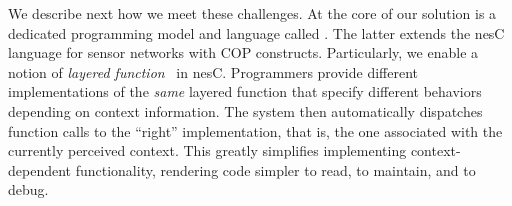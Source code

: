 We describe next how we meet these challenges. At the core of our
solution is a dedicated programming model and language called
{}. The latter extends the nesC~\cite{gay03:nesc}
language for sensor networks with COP constructs. Particularly, we
enable a notion of \emph{layered function}~\cite{hirschfeld08} in
nesC. Programmers provide different implementations of the \emph{same}
layered function that specify different behaviors depending on context
information. The system then automatically dispatches function calls
to the ``right'' implementation, that is, the one associated with the
currently perceived context. This greatly simplifies implementing
context-dependent functionality, rendering code
simpler to read, to maintain, and to debug.


